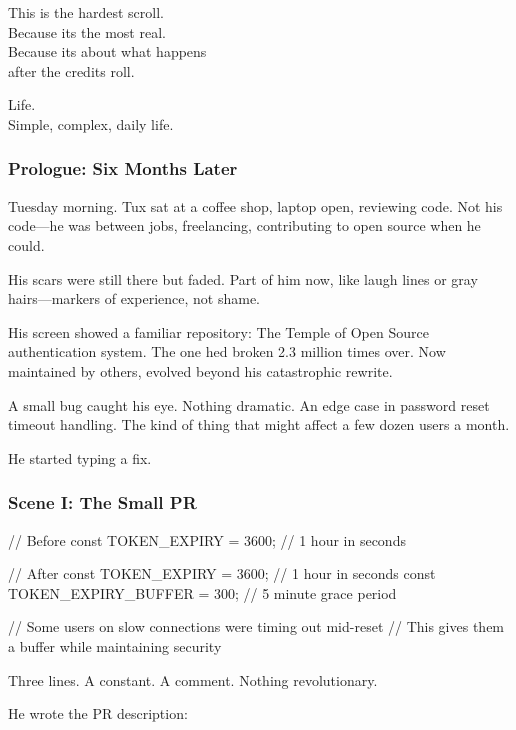 This is the hardest scroll.\\
Because it\textquotesingle s the most real.\\
Because it\textquotesingle s about what happens\\
after the credits roll.

Life.\\
Simple, complex, daily life.

\bookdivider

\subsubsection{Prologue: Six Months Later}\label{prologue-six-months-later}

Tuesday morning. Tux sat at a coffee shop, laptop open, reviewing code. Not his code---he was between jobs, freelancing, contributing to open source when he could.

His scars were still there but faded. Part of him now, like laugh lines or gray hairs---markers of experience, not shame.

His screen showed a familiar repository: The Temple of Open Source authentication system. The one he\textquotesingle d broken 2.3 million times over. Now maintained by others, evolved beyond his catastrophic rewrite.

A small bug caught his eye. Nothing dramatic. An edge case in password reset timeout handling. The kind of thing that might affect a few dozen users a month.

He started typing a fix.

\bookdivider

\subsubsection{Scene I: The Small PR}\label{scene-i-the-small-pr}

\begin{codeblock}
// Before
const TOKEN_EXPIRY = 3600; // 1 hour in seconds

// After  
const TOKEN_EXPIRY = 3600; // 1 hour in seconds
const TOKEN_EXPIRY_BUFFER = 300; // 5 minute grace period

// Some users on slow connections were timing out mid-reset
// This gives them a buffer while maintaining security
\end{codeblock}

Three lines. A constant. A comment. Nothing revolutionary.

He wrote the PR description:

